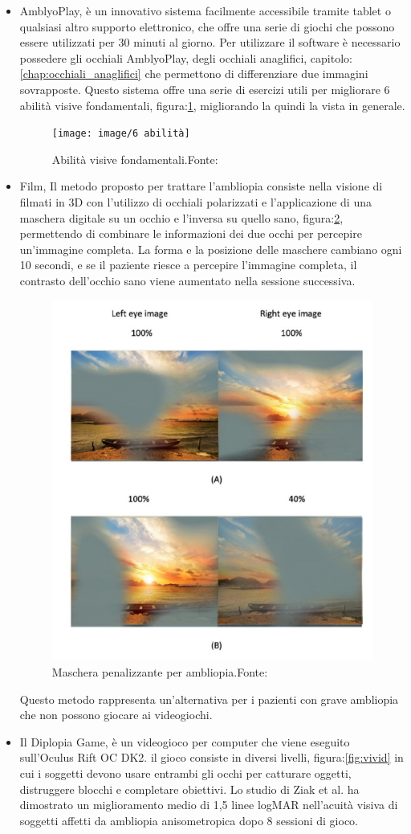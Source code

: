 \documentclass[
a4paper,
cleardoublepage=empty,
headings=twolinechapter,
numbers=autoenddot,
]{scrbook}
\begin{document}
\begin{itemize}
		\item AmblyoPlay, è un innovativo sistema facilmente accessibile tramite tablet o qualsiasi altro supporto elettronico, che offre una serie di giochi che possono essere utilizzati per 30 minuti al giorno. Per utilizzare il software è necessario possedere gli occhiali AmblyoPlay, degli occhiali anaglifici, capitolo:\ref{chap:occhiali_anaglifici} che permettono di differenziare due immagini sovrapposte. Questo sistema offre una serie di esercizi utili per migliorare 6 abilità visive fondamentali, figura:\ref{fig:6 abilità}, migliorando la quindi la vista in generale.
    	\begin{figure}[H]
			\centering
			\texttt{[image: image/6 abilità]}
			\caption{Abilità visive fondamentali.Fonte:\cite{amblyoplay}}
			\label{fig:6 abilità}
     	\end{figure}
		\item Film, Il metodo proposto per trattare l'ambliopia consiste nella visione di filmati in 3D con l'utilizzo di occhiali polarizzati e l'applicazione di una maschera digitale su un occhio e l'inversa su quello sano, figura:\ref{fig:film}, permettendo di combinare le informazioni dei due occhi per percepire un'immagine completa. La forma e la posizione delle maschere cambiano ogni 10 secondi, e se il paziente riesce a percepire l'immagine completa, il contrasto dell'occhio sano viene aumentato nella sessione successiva. 
		\begin{figure}[H]
			\centering
			\includegraphics[width=0.5\linewidth]{image/filmAmblio}
			\caption{Maschera penalizzante per ambliopia.Fonte:\cite{nuoviTrattamenti}}
			\label{fig:film}
		\end{figure}
	    Questo metodo rappresenta un'alternativa per i pazienti con grave ambliopia che non possono giocare ai videogiochi.
	    \item Il Diplopia Game, è un videogioco per computer che viene eseguito sull'Oculus Rift OC DK2. il gioco consiste in diversi livelli, figura:\ref{fig:vivid} in cui i soggetti devono usare entrambi gli occhi per catturare oggetti, distruggere blocchi e completare obiettivi. Lo studio di Ziak et al. ha dimostrato un miglioramento medio di 1,5 linee logMAR nell'acuità visiva di soggetti affetti da ambliopia anisometropica dopo 8 sessioni di gioco.

\end{itemize}
\end{document}
